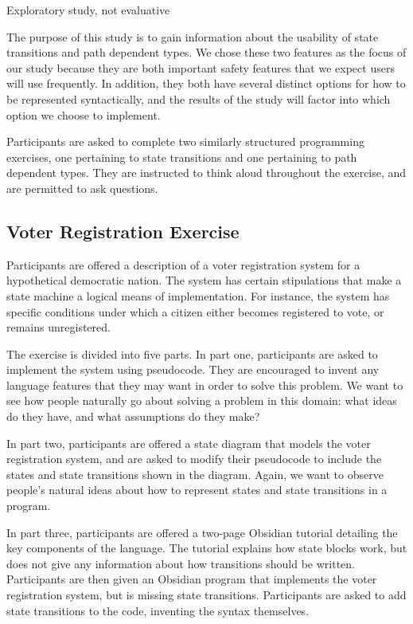 \documentclass[sigplan,10pt,review,anonymous]{acmart}\settopmatter{printfolios=true}
\begin{document}
Exploratory study, not evaluative

	The purpose of this study is to gain information about the usability of state transitions and path dependent 
types. We chose these two features as the focus of our study because they are both important safety features 
that we expect users will use frequently. In addition, they both have several distinct options for how to be 
represented syntactically, and the results of the study will factor into which option we choose to implement.  

Participants are asked to complete two similarly structured programming exercises, one pertaining to state 
transitions and one pertaining to path dependent types. They are instructed to think aloud throughout the exercise, 
and are permitted to ask questions.  

\subsection{Voter Registration Exercise}

Participants are offered a description of a voter registration system for a hypothetical democratic nation. The 
system has certain stipulations that make a state machine a logical means of implementation. For instance, the 
system has specific conditions under which a citizen either becomes registered to vote, or remains unregistered. 

The exercise is divided into five parts. In part one, participants are asked to implement the system using 
pseudocode. They are encouraged to invent any language features that they may want in order to solve this 
problem. We want to see how people naturally go about solving a problem in this domain: what ideas do they 
have, and what assumptions do they make? 
	
In part two, participants are offered a state diagram that models the voter registration system, and are asked to 
modify their pseudocode to include the states and state transitions shown in the diagram. Again, we want to 
observe people's natural ideas about how to represent states and state transitions in a program.

In part three, participants are offered a two-page Obsidian tutorial detailing the key components of the language. 
The tutorial explains how state blocks work, but does not give any information about how transitions should be 
written. Participants are then given an Obsidian program that implements the voter registration system, but is 
missing state transitions. Participants are asked to add state transitions to the code, inventing the syntax 
themselves.
\end{document}
